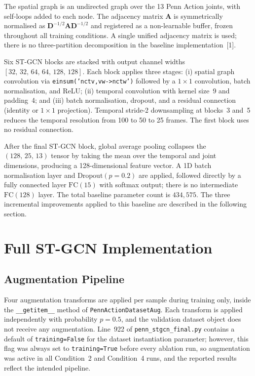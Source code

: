 The spatial graph is an undirected graph over the 13 Penn Action joints, with self-loops added to each node. The adjacency matrix $\mathbf{A}$ is symmetrically normalised as $\mathbf{D}^{-1/2}\mathbf{A}\mathbf{D}^{-1/2}$ and registered as a non-learnable buffer, frozen throughout all training conditions. A single unified adjacency matrix is used; there is no three-partition decomposition in the baseline implementation~[1].

Six ST-GCN blocks are stacked with output channel widths $[32,\,32,\,64,\,64,\,128,\,128]$. Each block applies three stages: (i) spatial graph convolution via \texttt{einsum('nctv,vw->nctw')} followed by a $1{\times}1$ convolution, batch normalisation, and ReLU; (ii) temporal convolution with kernel size~9 and padding~4; and (iii) batch normalisation, dropout, and a residual connection (identity or $1{\times}1$ projection). Temporal stride-2 downsampling at blocks~3 and~5 reduces the temporal resolution from 100 to 50 to 25 frames. The first block uses no residual connection.

After the final ST-GCN block, global average pooling collapses the $(128,\,25,\,13)$ tensor by taking the mean over the temporal and joint dimensions, producing a 128-dimensional feature vector. A 1D batch normalisation layer and $\text{Dropout}(p = 0.2)$ are applied, followed directly by a fully connected layer $\text{FC}(15)$ with softmax output; there is no intermediate $\text{FC}(128)$ layer. The total baseline parameter count is $434{,}575$. The three incremental improvements applied to this baseline are described in the following section.

\section{Full ST-GCN Implementation}
\label{sec:fullstgcn}

\subsection{Augmentation Pipeline}
\label{subsec:augmentation}

Four augmentation transforms are applied per sample during training only, inside the \texttt{\_\_getitem\_\_} method of \texttt{PennActionDatasetAug}. Each transform is applied independently with probability $p = 0.5$, and the validation dataset object does not receive any augmentation. Line~922 of \texttt{penn\_stgcn\_final.py} contains a default of \texttt{training=False} for the dataset instantiation parameter; however, this flag was always set to \texttt{training=True} before every ablation run, so augmentation was active in all Condition~2 and Condition~4 runs, and the reported results reflect the intended pipeline.

